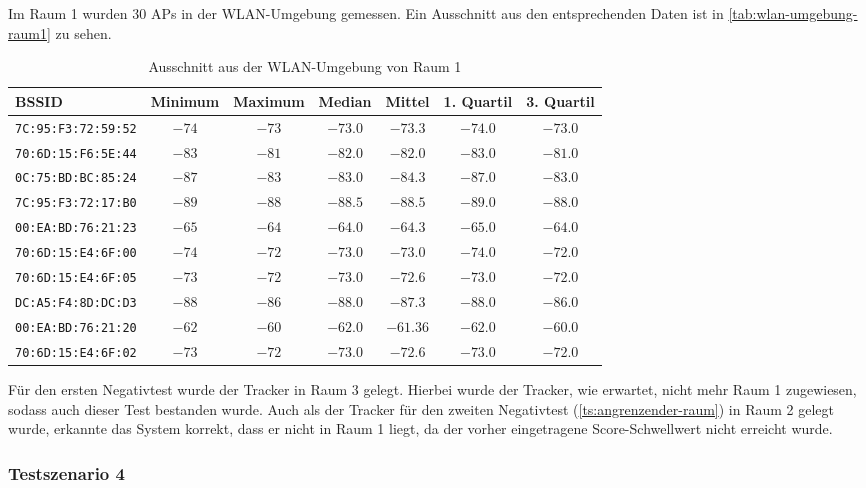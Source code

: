 Im Raum 1 wurden $30$ \glspl{AP} in der \gls{WLAN}-Umgebung gemessen. Ein Ausschnitt aus den
entsprechenden Daten ist in \autoref{tab:wlan-umgebung-raum1} zu sehen.

\begin{table}[htbp]
	\def\arraystretch{1.1}
	\centering
	\begin{tabular}{l c c c c c c}
		\gls{BSSID}	 & Minimum & Maximum & Median & Mittel & 1. Quartil & 3. Quartil \\ \hline
		\texttt{7C:95:F3:72:59:52} & $-74$     & $-73$     & $-73.0$  & $-73.3$  & $-74.0$ & $-73.0$ \\
		\texttt{70:6D:15:F6:5E:44} & $-83$     & $-81$     & $-82.0$  & $-82.0$  & $-83.0$ & $-81.0$ \\
		\texttt{0C:75:BD:BC:85:24} & $-87$     & $-83$     & $-83.0$  & $-84.3$  & $-87.0$ & $-83.0$ \\
		\texttt{7C:95:F3:72:17:B0} & $-89$     & $-88$     & $-88.5$  & $-88.5$  & $-89.0$ & $-88.0$ \\
		\texttt{00:EA:BD:76:21:23} & $-65$     & $-64$     & $-64.0$  & $-64.3$  & $-65.0$ & $-64.0$ \\
		\texttt{70:6D:15:E4:6F:00} & $-74$     & $-72$     & $-73.0$  & $-73.0$  & $-74.0$ & $-72.0$ \\
		\texttt{70:6D:15:E4:6F:05} & $-73$     & $-72$     & $-73.0$  & $-72.6$  & $-73.0$ & $-72.0$ \\
		\texttt{DC:A5:F4:8D:DC:D3} & $-88$     & $-86$     & $-88.0$  & $-87.3$  & $-88.0$ & $-86.0$ \\
		\texttt{00:EA:BD:76:21:20} & $-62$     & $-60$     & $-62.0$  & $-61.36$ & $-62.0$ & $-60.0$ \\
		\texttt{70:6D:15:E4:6F:02} & $-73$     & $-72$     & $-73.0$  & $-72.6$  & $-73.0$ & $-72.0$ \\
	\end{tabular}
	\caption{Ausschnitt aus der \gls{WLAN}-Umgebung von Raum 1}
	\label{tab:wlan-umgebung-raum1}
\end{table}

Für den ersten Negativtest wurde der Tracker in Raum 3 gelegt. Hierbei wurde der Tracker, wie
erwartet, nicht mehr Raum 1 zugewiesen, sodass auch dieser Test bestanden wurde. Auch als der
Tracker für den zweiten Negativtest (\ref{ts:angrenzender-raum}) in Raum 2 gelegt wurde, erkannte
das System korrekt, dass er nicht in Raum 1 liegt, da der vorher eingetragene Score-Schwellwert
nicht erreicht wurde.

\subsubsection{Testszenario 4}

